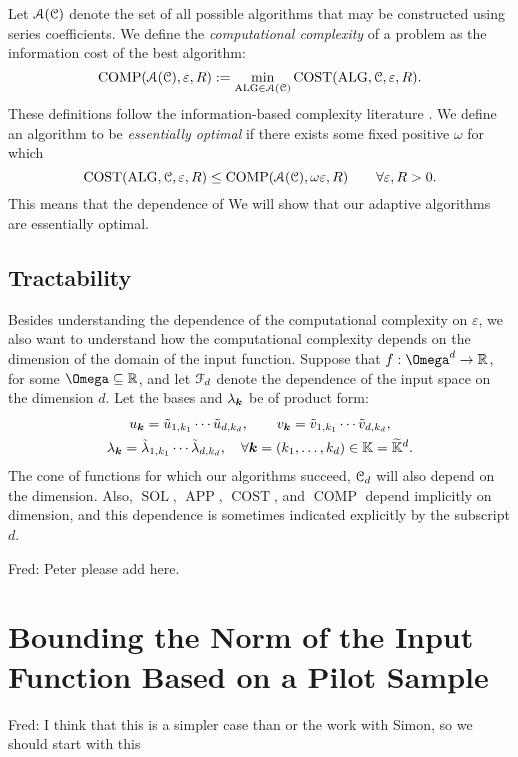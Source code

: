 \documentclass[USenglish]{article}
\DeclareMathOperator{\SOL}{SOL}
\DeclareMathOperator{\APP}{APP}
\DeclareMathOperator{\ALG}{ALG}
\DeclareMathOperator{\COST}{COST}
\DeclareMathOperator{\COMP}{COMP}
\newcommand{\tu}{\Tilde{u}}
\newcommand{\tv}{\Tilde{v}}
\newcommand{\tlambda}{\Tilde{\lambda}}
\newcommand{\tbbK}{\widetilde{\bbK}}
\newcommand{\FredNote}[1]{{\color{blue}Fred: #1}}
\begin{document}
Let ${\mathcal{A}}({\mathcal{C}})$ denote the set of all possible algorithms that may be constructed using series coefficients.  We define the \emph{computational complexity} of a problem as the information cost of the best algorithm:
\begin{equation*}
    \COMP(\calA(\calC), \varepsilon,R) := \min_{\ALG \in \calA(\calC)} \COST(\ALG, \calC, \varepsilon,R) .
\end{equation*}
These definitions follow the information-based complexity literature \cite{TraWer98, TraWasWoz88}.
We define an algorithm to be \emph{essentially optimal} if there exists some fixed positive $\omega$ for which
\begin{equation*}
    \COST(\ALG, \calC, \varepsilon,R) \le \COMP(\calA(\calC), \omega \varepsilon,R) \qquad \forall \varepsilon,R > 0.
\end{equation*}
This means that the dependence of 
We will show that our adaptive algorithms are essentially optimal.

\subsection{Tractability}
Besides understanding the dependence of the computational complexity on $\varepsilon$, we also want to understand how the computational complexity depends on the dimension of the domain of the input function.  Suppose that $f: \Omega^d \to \R$, for some $\Omega \subseteq \R$, and let ${\mathcal{F}}_d$ denote the dependence of the input space on the dimension $d$.  Let the bases and $\lambda_{{\boldsymbol{k}}}$ be of product form:
\begin{gather*}
    u_{\bsk} = \tu_{1,k_1} \cdots \tu_{d,k_d}, \qquad  v_{\bsk} = \tv_{1,k_1} \cdots \tv_{d,k_d}, \\ 
    \lambda_{\bsk} = \tlambda_{1,k_1} \cdots \tlambda_{d,k_d}, \quad \forall \bsk = (k_1, \ldots, k_d) \in \bbK = \tbbK^d.
\end{gather*}
The cone of functions for which our algorithms succeed, ${\mathcal{C}}_d$ will also depend on the dimension.  Also, $\SOL$, $\APP$, $\COST$, and $\COMP$ depend implicitly on dimension, and this dependence is sometimes indicated explicitly by the subscript $d$.

\FredNote{Peter please add here.}




\section{Bounding the Norm of the Input Function Based on a Pilot Sample} 
\FredNote{I think that this is a simpler case than \cite{DinHic20a} or the work with Simon, so we should start with this}
\end{document}
